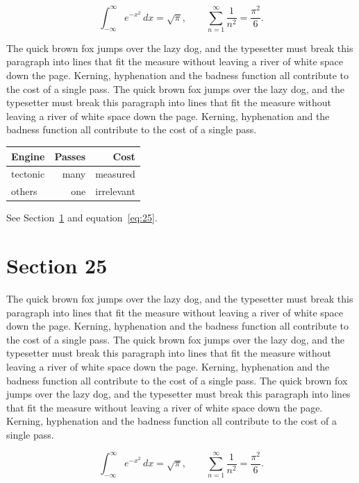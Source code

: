 \documentclass{article}
\begin{document}
\begin{equation}\label{eq:24}
\int_{-\infty}^{\infty} e^{-x^{2}}\,dx = \sqrt{\pi}, \qquad
\sum_{n=1}^{\infty} \frac{1}{n^{2}} = \frac{\pi^{2}}{6}.
\end{equation}

The quick brown fox jumps over the lazy dog, and the typesetter must break this paragraph into lines that fit the measure without leaving a river of white space down the page. Kerning, hyphenation and the badness function all contribute to the cost of a single pass. The quick brown fox jumps over the lazy dog, and the typesetter must break this paragraph into lines that fit the measure without leaving a river of white space down the page. Kerning, hyphenation and the badness function all contribute to the cost of a single pass. 

\begin{center}
\begin{tabular}{lrr}
\toprule
Engine & Passes & Cost \\
\midrule
tectonic & many & measured \\
others & one & irrelevant \\
\bottomrule
\end{tabular}
\end{center}

See Section~\ref{sec:25} and equation~\eqref{eq:25}.
\section{Section 25}
\label{sec:25}
The quick brown fox jumps over the lazy dog, and the typesetter must break this paragraph into lines that fit the measure without leaving a river of white space down the page. Kerning, hyphenation and the badness function all contribute to the cost of a single pass. The quick brown fox jumps over the lazy dog, and the typesetter must break this paragraph into lines that fit the measure without leaving a river of white space down the page. Kerning, hyphenation and the badness function all contribute to the cost of a single pass. The quick brown fox jumps over the lazy dog, and the typesetter must break this paragraph into lines that fit the measure without leaving a river of white space down the page. Kerning, hyphenation and the badness function all contribute to the cost of a single pass. 

\begin{equation}\label{eq:25}
\int_{-\infty}^{\infty} e^{-x^{2}}\,dx = \sqrt{\pi}, \qquad
\sum_{n=1}^{\infty} \frac{1}{n^{2}} = \frac{\pi^{2}}{6}.
\end{equation}
\end{document}
